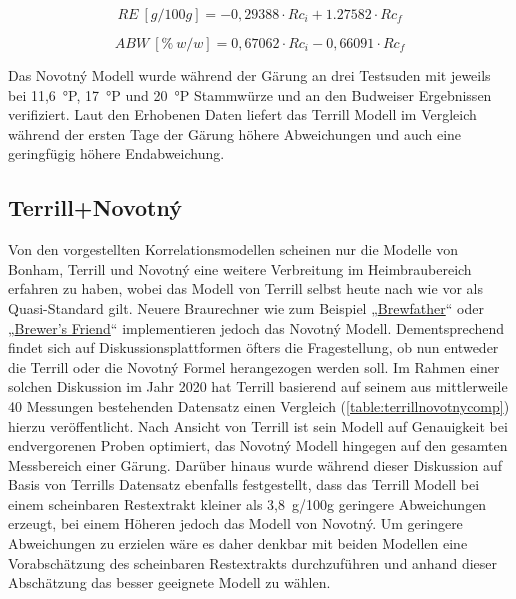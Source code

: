 \documentclass[a4paper,parskip=half]{scrartcl}
\newcommand{\bxic}{\mathit{Rc}_i}
\newcommand{\bxfc}{\mathit{Rc}_f}
\newcommand{\abw}{\mathit{ABW}}
\newcommand{\rex}{\mathit{RE}}
\begin{document}
\begin{equation}
\rex\:[g/100g] = -0,29388 \cdot \bxic + 1.27582 \cdot \bxfc
\label{eq:novotnyre}
\end{equation}

\begin{equation}
\abw\:[\%\:w/w] = 0,67062 \cdot \bxic - 0,66091 \cdot \bxfc
\label{eq:novotnyabw}
\end{equation}

Das Novotný Modell wurde während der Gärung an drei Testsuden mit jeweils
bei 11,6~°P, 17~°P und 20~°P Stammwürze und an den Budweiser
Ergebnissen verifiziert. Laut den Erhobenen Daten liefert das Terrill
Modell im Vergleich während der ersten Tage der Gärung höhere
Abweichungen und auch eine geringfügig höhere Endabweichung.
\autocite{Novotny2017a,Novotny2017}

\subsection*{Terrill+Novotný}

Von den vorgestellten Korrelationsmodellen scheinen nur die
Modelle von Bonham, Terrill und Novotný eine weitere Verbreitung im Heimbraubereich erfahren zu haben, wobei das Modell von Terrill selbst
heute nach wie vor als Quasi-Standard gilt. Neuere Braurechner
wie zum Beispiel „\href{https://brewfather.app}{Brewfather}“
oder „\href{https://www.brewersfriend.com/refractometer-calculator}
{Brewer's Friend}“ implementieren jedoch das Novotný Modell.
Dementsprechend findet sich auf Diskussionsplattformen öfters die Fragestellung, ob nun
entweder die Terrill oder die Novotný Formel herangezogen werden
soll. Im Rahmen einer solchen Diskussion im Jahr 2020 hat Terrill
basierend auf seinem aus mittlerweile 40 Messungen bestehenden Datensatz
einen Vergleich (\autoref{table:terrillnovotnycomp}) hierzu veröffentlicht.
Nach Ansicht von Terrill ist sein Modell auf Genauigkeit bei endvergorenen
Proben optimiert, das Novotný Modell hingegen auf den gesamten
Messbereich einer Gärung. Darüber hinaus wurde während dieser Diskussion
auf Basis von Terrills Datensatz ebenfalls festgestellt, dass das
Terrill Modell bei einem scheinbaren Restextrakt kleiner als 3,8~g/100g 
geringere Abweichungen erzeugt, bei einem Höheren jedoch das Modell von
Novotný. Um geringere Abweichungen zu erzielen wäre es daher denkbar mit
beiden Modellen eine Vorabschätzung des scheinbaren Restextrakts
durchzuführen und anhand dieser Abschätzung das besser geeignete Modell zu
wählen. \autocite{h22lude2020}
\end{document}

